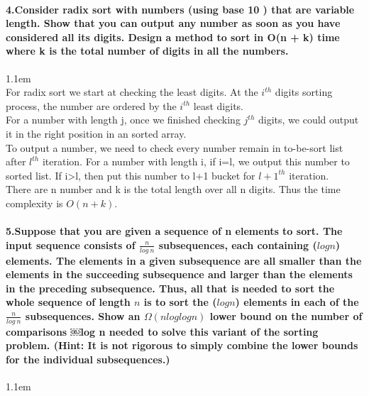 \documentclass[11pt]{article}
\begin{document}
\paragraph{4.Consider radix sort with numbers (using base 10 ) that are variable length. Show that you can output any number as soon as you have considered all its digits.
Design a method to sort in O(n + k) time where k is the total number of digits in all the numbers.}
\hangindent 1.1em
\noindent
\\For radix sort we start at checking the least digits. At the $i^{th}$ digits sorting process, the number are ordered by the $i^{th}$ least digits.
\\For a number with length j, once we finished checking $j^{th}$ digits, we could output it in the right position in an sorted array.
\\To output a number, we need to check every number remain in to-be-sort list after $l^{th}$ iteration. For a number with length i, if i=l, we output this number to sorted list. If i>l, then put this number to l+1 bucket for $l+1^{th}$ iteration.
\\There are n number and k is the total length over all n digits. Thus the time complexity is  $O(n+k)$.
\\
\paragraph{5.Suppose that you are given a sequence of n elements to sort. The input sequence consists of $\frac{n}{log\ n}$ subsequences, each containing ($log n$) elements. The elements in a given subsequence are all 
smaller than the elements in the succeeding subsequence and larger than the elements in the preceding
subsequence. Thus, all that is needed to sort the whole sequence of length $n$ is to sort the ($log n$) elements in each of the $\frac{n}{log\ n}$ subsequences. Show an $\Omega (nloglogn)$ lower bound on the number of comparisons
￼log n
needed to solve this variant of the sorting problem. (Hint: It is not rigorous to simply combine the
lower bounds for the individual subsequences.)}
\hangindent 1.1em
\noindent
\end{document}
